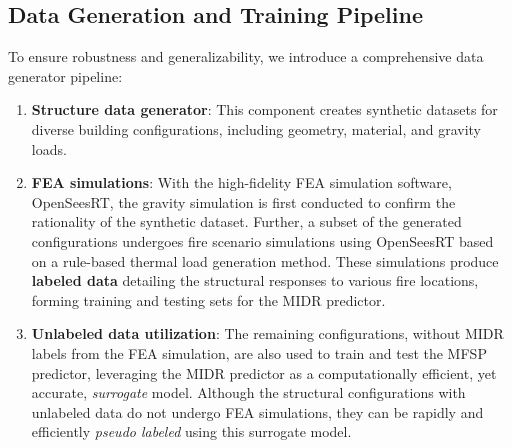 \subsection{Data Generation and Training Pipeline}
To ensure robustness and generalizability, we introduce a comprehensive data generator pipeline:
\begin{enumerate}
    \item {\bf{Structure data generator}}: This component creates synthetic datasets for diverse building configurations, including geometry, material, and gravity loads.
    \item {\bf{FEA simulations}}: With the high-fidelity FEA simulation software, OpenSeesRT, the gravity simulation is first conducted to confirm the rationality of the synthetic dataset. Further, a subset of the generated configurations undergoes fire scenario simulations using OpenSeesRT based on a rule-based thermal load generation method. These simulations produce \textbf{labeled data} detailing  the structural responses to various fire locations, forming training and testing sets for the MIDR predictor.
    \item {\bf{Unlabeled data utilization}}: The remaining configurations, without MIDR labels from the FEA simulation, are also used to train and test the MFSP predictor, leveraging the MIDR predictor as a computationally efficient, yet accurate, {\em{surrogate}} model. Although the structural configurations with unlabeled data do not undergo FEA simulations, they can be rapidly and efficiently  \emph{pseudo labeled} using this surrogate model.
\end{enumerate}

